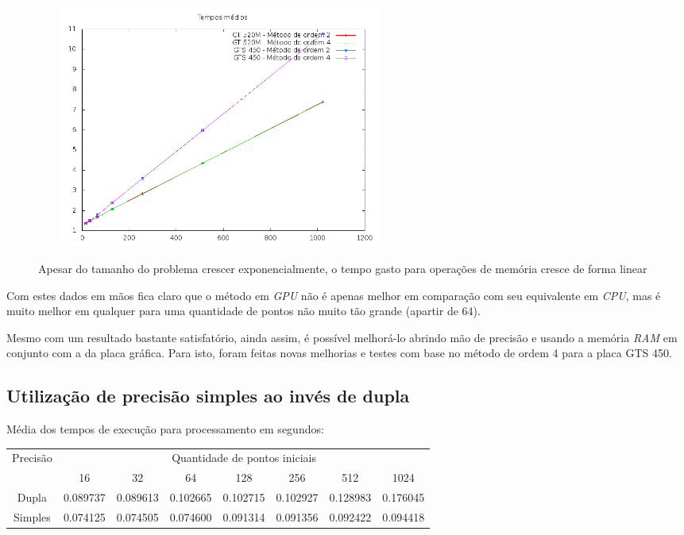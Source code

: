   \begin{figure}[!h]
    \begin{center}
       \includegraphics[width=120mm, height=80mm]{images/gpu-memo-means-double.png}
       \label{fig:gpu-memo-means-double}
       \caption{Apesar do tamanho do problema crescer exponencialmente, o tempo gasto para operações de memória cresce de forma linear}
    \end{center}
  \end{figure}
  
  Com estes dados em mãos fica claro que o método em \textit{GPU} não é apenas melhor em comparação com seu equivalente em \textit{CPU}, mas é muito melhor em qualquer para uma quantidade de pontos não muito tão grande (apartir de 64).
  
  Mesmo com um resultado bastante satisfatório, ainda assim, é possível melhorá-lo abrindo mão de precisão e usando a memória \textit{RAM} em conjunto com a da placa gráfica. Para isto, foram feitas novas melhorias e testes com base no método de ordem 4 para a placa GTS 450.

  \subsection{Utilização de precisão simples ao invés de dupla}
  \begin{small}
  Média dos tempos de execução para processamento em segundos:\\
  \begin{tabular}{| c | c | c | c | c | c | c | c |}
    \hline
    \multirow{2}{*}{Precisão}& \multicolumn{7}{|c|}{Quantidade de pontos iniciais} \\ \cline{2-8}
    & 16 & 32 & 64 & 128 & 256 & 512 & 1024 \\ \hline
    Dupla & 0.089737 & 0.089613 & 0.102665 & 0.102715 & 0.102927 & 0.128983 & 0.176045\\ \hline
    Simples & 0.074125 & 0.074505 & 0.074600 & 0.091314 & 0.091356 & 0.092422 & 0.094418\\ \hline

    \hline
  \end{tabular}
  \end{small}  
  \hspace{1mm}\newline
  
